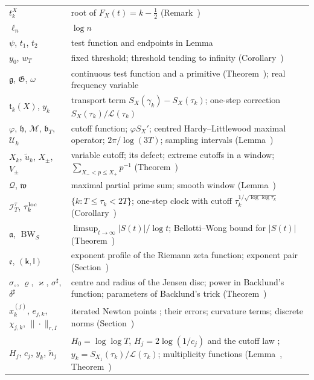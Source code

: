 \documentclass[preprint,12pt]{elsarticle}
\makeatletter
\let\CG@origref\ref
\let\CG@origeqref\eqref
\newcommand{\CG@gettip}[1]{\@ifundefined{CGTip@#1}{Reference: #1}{\csname CGTip@#1\endcsname}}
\DeclareRobustCommand{\CGref}[1]{\pdftooltip{\CG@origref{#1}}{\CG@gettip{#1}}}
\DeclareRobustCommand{\CGeqref}[1]{\pdftooltip{\CG@origeqref{#1}}{\CG@gettip{#1}}}
\numberwithin{equation}{section}
\theoremstyle{plain}
\theoremstyle{definition}
\theoremstyle{remark}
\newcommand{\lL}{\mathcal L}
\newcommand{\BWS}{\operatorname{BW}_S}
\makeatother
\begin{document}
\begin{center}
\begin{longtable}{p{}p{}}
$t_k^X$ & root of $F_X(t)=k-\frac12$ (Remark~\CGref{rem:localization})\\
$\ell_n$ & $\log n$\\
$\psi$, $t_1$, $t_2$ & test function and endpoints in Lemma~\CGref{lem:first_moment_identity}\\
$y_0$, $w_T$ & fixed threshold; threshold tending to infinity (Corollary~\CGref{cor:dichotomy})\\
$\mathfrak g$, $\mathfrak G$, $\omega$ & continuous test function and a primitive (Theorem~\CGref{thm:identity_g}); real frequency variable\\
$\mathfrak t_k(X)$, $y_k$ & transport term $S_X(\gamma_k)-S_X(\tau_k)$; one-step correction $S_X(\tau_k)/\lL(\tau_k)$\\
$\varphi$, $\mathfrak h$, $\mathcal M$, $\mathfrak b_T$, $\mathcal U_k$ & cutoff function; $\varphi S_X'$; centred Hardy--Littlewood maximal operator; $2\pi/\log(3T)$; sampling intervals (Lemma~\CGref{lem:transport})\\
$X_k$, $\tilde u_k$, $X_\pm$, $V_\pm$ & variable cutoff; its defect; extreme cutoffs in a window; $\sum_{X_-<p\le X_+}p^{-1}$ (Theorem~\CGref{thm:variable_cutoff})\\
$\mathcal Q$, $\mathfrak w$ & maximal partial prime sum; smooth window (Lemma~\CGref{lem:maximal_primes})\\
$\mathcal I_T^\tau$, $\tau_k^{\rm loc}$ & $\{k:T\le\tau_k<2T\}$; one-step clock with cutoff $\tau_k^{1/\sqrt{\log\log\tau_k}}$ (Corollary~\CGref{cor:local_clock})\\
$\mathfrak a$, $\BWS$ & $\limsup_{t\to\infty}|S(t)|/\log t$; Bellotti--Wong bound for $|S(t)|$ (Theorem~\CGref{thm:known_BW})\\
$\mathfrak e$, $(\mathsf k,\mathsf l)$ & exponent profile of the Riemann zeta function; exponent pair (Section~\CGref{sec:envelope})\\
$\sigma_\circ$, $\varrho$, $\varkappa$, $\sigma^\sharp$, $\delta^\sharp$ & centre and radius of the Jensen disc; power in Backlund's function; parameters of Backlund's trick (Theorem~\CGref{thm:known_backlund})\\
$x^{(j)}_k$, $e_{j,k}$, $\chi_{j,k}$, $\|\cdot\|_{r,I}$ & iterated Newton points \CGeqref{eq:newton_iteration}; their errors; curvature terms; discrete norms (Section~\CGref{sec:iteration})\\
$H_j$, $c_j$, $y_k$, $\tilde n_j$ & $H_0=\log\log T$, $H_j=2\log(1/c_j)$ and the cutoff law \CGeqref{eq:cutoff_law}; $y_k=S_{X_1}(\tau_k)/\lL(\tau_k)$; multiplicity functions (Lemma~\CGref{lem:multiplicity}, Theorem~\CGref{thm:multiplicity_all})\\

\end{longtable}
\end{center}
\end{document}
